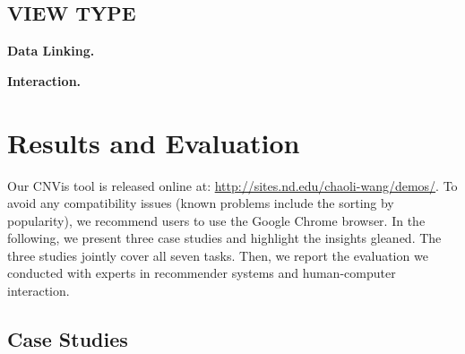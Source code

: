 \documentclass[letterpaper,twocolumn,fleqn]{article}
\newcommand{\sam}[1]{{\color{red} #1}}
\begin{document}

\subsection{VIEW TYPE}

{\bf Data Linking.} 

{\bf Interaction.} 


\section{Results and Evaluation}
\label{sec:results}

Our CNVis tool is released online at: 
\url{http://sites.nd.edu/chaoli-wang/demos/}. 
To avoid any compatibility issues (known problems include the sorting by popularity), we recommend users to use the Google Chrome browser. In the following, we present three case studies and highlight the insights gleaned. The three studies jointly cover all seven tasks. Then, we report the evaluation we conducted with experts in recommender systems and human-computer interaction. 

\subsection{Case Studies}
\end{document}
